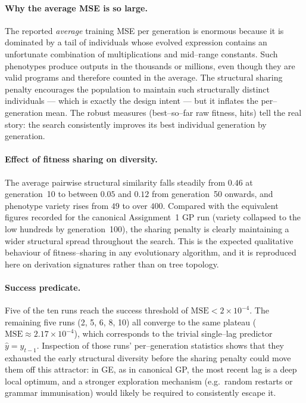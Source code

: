 \documentclass[12pt,a4paper]{article}
\begin{document}
\paragraph{Why the average MSE is so large.}
The reported \emph{average} training MSE per generation is enormous
because it is dominated by a tail of individuals whose evolved
expression contains an unfortunate combination of multiplications and
mid--range constants. Such phenotypes produce outputs in the
thousands or millions, even though they are valid programs and
therefore counted in the average. The structural sharing penalty
encourages the population to maintain such structurally distinct
individuals --- which is exactly the design intent --- but it inflates
the per--generation mean. The robust measures (best--so--far raw
fitness, hits) tell the real story: the search consistently improves
its best individual generation by generation.

\paragraph{Effect of fitness sharing on diversity.}
The average pairwise structural similarity falls steadily from $0.46$
at generation~10 to between $0.05$ and $0.12$ from generation~50
onwards, and phenotype variety rises from $49$ to over $400$.
Compared with the equivalent figures recorded for the canonical
Assignment~1 GP run (variety collapsed to the low hundreds by
generation~100), the sharing penalty is clearly maintaining a wider
structural spread throughout the search. This is the expected
qualitative behaviour of fitness--sharing in any evolutionary
algorithm, and it is reproduced here on derivation signatures rather
than on tree topology.

\paragraph{Success predicate.}
Five of the ten runs reach the success threshold of
$\mathrm{MSE} < 2\times 10^{-4}$. The remaining five runs (2, 5, 6, 8,
10) all converge to the same plateau ($\mathrm{MSE}\approx
2.17\times 10^{-4}$), which corresponds to the trivial single--lag
predictor $\hat{y}=y_{t-1}$. Inspection of those runs' per--generation
statistics shows that they exhausted the early structural diversity
before the sharing penalty could move them off this attractor: in GE,
as in canonical GP, the most recent lag is a deep local optimum, and a
stronger exploration mechanism (e.g.\ random restarts or grammar
immunisation) would likely be required to consistently escape it.
\end{document}
